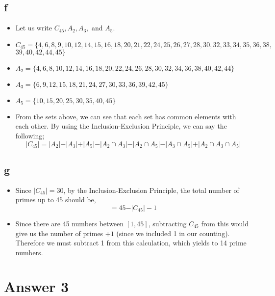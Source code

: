 \documentclass[12pt]{article}
\begin{document}
\subsection*{f}
\begin{itemize}
    \item Let us write $C_{45}, A_2, A_3, $ and $A_5$. 
    \item $ C_{45}=\{4,6,8,9,10,12,14,15,16,18,20,21,22,24,25,26,27,28,30,32,33,34,35, 36,38, $ \\ $39,40,42,44,45\} $
    \item $A_2=\{4,6,8,10,12,14,16,18,20,22,24,26,28,30,32,34,36,38,40,42,44\}$
    \item $A_3=\{6,9,12,15,18,21,24,27,30,33,36,39,42,45\}$
    \item $A_5=\{10,15,20,25,30,35,40,45\}$
    \item From the sets above, we can see that each set has common elements with each other. By using the Inclusion-Exclusion Principle, we can say the following;
    $$ \vert C_{45} \vert = \vert A_2 \vert + \vert A_3 \vert + \vert A_5 \vert - \vert A_2 \cap A_3 \vert - \vert A_2 \cap A_5 \vert - \vert A_3 \cap A_5 \vert + \vert A_2 \cap A_3 \cap A_5 \vert  $$ 
\end{itemize}
\subsection*{g}
\begin{itemize}
    \item Since $\vert C_{45} \vert = 30$, by the Inclusion-Exclusion Principle, the total number of primes up to 45 should be,
    $$ = 45 - \vert C_{45} \vert - 1$$ 
    \item Since there are 45 numbers between $[1,45]$, subtracting $C_{45}$ from this would give us the number of primes $+1$ (since we included 1 in our counting). Therefore we must subtract 1 from this calculation, which yields to 14 prime numbers.
\end{itemize}

\section*{Answer 3}
\end{document}
